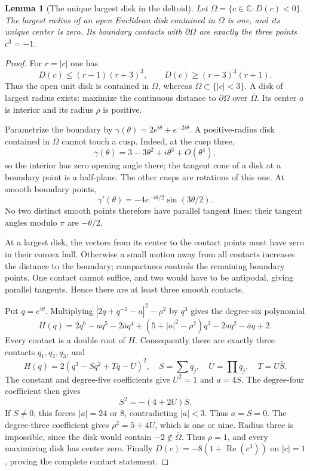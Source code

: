 \documentclass[UTF8,11pt]{ctexart}
\newtheorem{lem}[thm]{Lemma}
\theoremstyle{definition}
\numberwithin{equation}{section}
\newcommand{\C}{\mathbb C}\newcommand{\R}{\mathbb R}
\DeclareMathOperator{\Rea}{Re}\DeclareMathOperator{\Ima}{Im}
\begin{document}
\begin{lem}[The unique largest disk in the deltoid]
\label{v28:lem:inradius}
Let $\Omega=\{c\in\C:D(c)<0\}$. The largest radius of an open
Euclidean disk contained in $\Omega$ is one, and its unique center
is zero. Its boundary contacts with $\partial\Omega$ are exactly
the three points $c^3=-1$.
\end{lem}
\begin{proof}
For $r=|c|$ one has
\[
 D(c)\le(r-1)(r+3)^3,\qquad
 D(c)\ge(r-3)^3(r+1).
\]
Thus the open unit disk is contained in $\Omega$, whereas
$\Omega\subset\{|c|<3\}$. A disk of largest radius exists:
maximize the continuous distance to $\partial\Omega$ over
$\overline\Omega$. Its center $a$ is interior and its radius
$\rho$ is positive.

Parametrize the boundary by
$\gamma(\theta)=2e^{i\theta}+e^{-2i\theta}$.
A positive-radius disk contained in $\overline\Omega$ cannot
touch a cusp. Indeed, at the cusp three,
\[
 \gamma(\theta)=3-3\theta^2+i\theta^3+O(\theta^4),
\]
so the interior has zero opening angle there; the tangent cone
of a disk at a boundary point is a half-plane. The other cusps
are rotations of this one. At smooth boundary points,
\[
 \gamma'(\theta)=-4e^{-i\theta/2}\sin(3\theta/2).
\]
No two distinct smooth points therefore have parallel tangent
lines: their tangent angles modulo $\pi$ are $-\theta/2$.

At a largest disk, the vectors from its center to the contact
points must have zero in their convex hull. Otherwise a small
motion away from all contacts increases the distance to the
boundary; compactness controls the remaining boundary points.
One contact cannot suffice, and two would have to be antipodal,
giving parallel tangents. Hence there are at least three smooth
contacts.

Put $q=e^{i\theta}$. Multiplying
$|2q+q^{-2}-a|^2-\rho^2$ by $q^3$ gives the degree-six polynomial
\begin{equation}\label{v28:eq:circlepolynomial}
 H(q)=2q^6-aq^5-2\bar a q^4
 +(5+|a|^2-\rho^2)q^3-2aq^2-\bar a q+2.
\end{equation}
Every contact is a double root of $H$. Consequently there are
exactly three contacts $q_1,q_2,q_3$, and
\[
 H(q)=2(q^3-Sq^2+Tq-U)^2,
 \quad S=\sum q_j,\quad U=\prod q_j,\quad T=U\bar S.
\]
The constant and degree-five coefficients give $U^2=1$ and
$a=4S$. The degree-four coefficient then gives
\[
                         S^2=-(4+2U)\bar S.
\]
If $S\ne0$, this forces $|a|=24$ or $8$, contradicting
$|a|<3$. Thus $a=S=0$. The degree-three coefficient gives
$\rho^2=5+4U$, which is one or nine. Radius three is impossible,
since the disk would contain $-2\notin\overline\Omega$.
Thus $\rho=1$, and every maximizing disk has center zero.
Finally $D(c)=-8(1+\Rea(c^3))$ on $|c|=1$, proving the
complete contact statement.
\end{proof}
\end{document}
